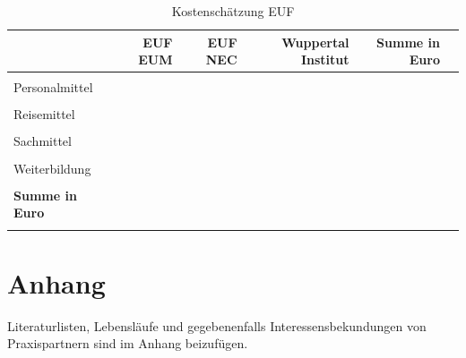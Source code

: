 \documentclass[a4paper,11pt,twoside]{scrartcl}
\begin{document}
\begin{table}[h]
\begin{center}
  \caption{Kostenschätzung EUF}
\begin{tabular}[h]{lrrrrr}
& EUF EUM & EUF NEC & Wuppertal Institut & Summe in Euro\\
\hline
\hline
&&&&\\
 Personalmittel & & & & &\\
 \hline
 &&&&\\
 Reisemittel & & & & &\\
 \hline
 &&&&\\
 Sachmittel & & & & &\\
 \hline
 &&&&\\
 Weiterbildung & & & & &\\
 \hline
 \hline
 &&&&\\
 \textbf{Summe in Euro}&& \textbf{}&\textbf{}&\underline{\textbf{}}\\
 \label{tab:kostenkalkulation}
\end{tabular}
\end{center}
\end{table}

\clearpage


%


\clearpage
\appendix

\section{Anhang}

Literaturlisten, Lebensläufe und gegebenenfalls Interessensbekundungen von Praxispartnern sind im Anhang beizufügen.
\end{document}
